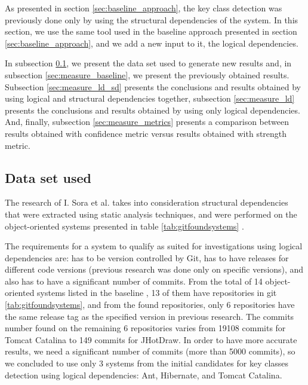 \documentclass[runningheads]{comsis2}
\begin{document}
As presented in section \ref{sec:baseline_approach}, the key class detection was previously done only by using the structural dependencies of the system. 
In this section, we use the same tool used in the baseline approach presented in section \ref{sec:baseline_approach}, and we add a new input to it, the logical dependencies. 

In subsection \ref{sec:dataset}, we present the data set used to generate new results and, in subsection \ref{sec:measure_baseline}, we present the previously obtained results. Subsection \ref{sec:measure_ld_sd} presents the conclusions and results obtained by using logical and structural dependencies together, subsection \ref{sec:measure_ld} presents the conclusions and results obtained by using only logical dependencies. And, finally, subsection \ref{sec:measure_metrics} presents a comparison between results obtained with confidence metric versus results obtained with strength metric.



\subsection{Data set used}
\label{sec:dataset}


The research of I. Sora et al. takes into consideration structural dependencies that were extracted using static analysis techniques, and were performed on the object-oriented systems presented in table \ref{tab:gitfoundsystems} \cite{Finding-key-classes}.

The requirements for a system to qualify as suited for investigations using logical dependencies are: has to be version controlled by Git, has to have releases for different code versions (previous research was done only on specific versions), and also has to have a significant number of commits. 
From the total of 14 object-oriented systems listed in the baseline \cite{Finding-key-classes}, 13 of them have repositories in git \ref{tab:gitfoundsystems}, and from the found repositories, only 6 repositories have the same release tag as the specified version in previous research.
The commits number found on the remaining 6 repositories varies from 19108 commits for Tomcat Catalina to 149 commits for JHotDraw. In order to have more accurate results, we need a significant number of commits (more than 5000 commits), so we concluded to use only 3 systems from the initial candidates for key classes detection using logical dependencies:  Ant, Hibernate, and Tomcat Catalina.  
\end{document}
